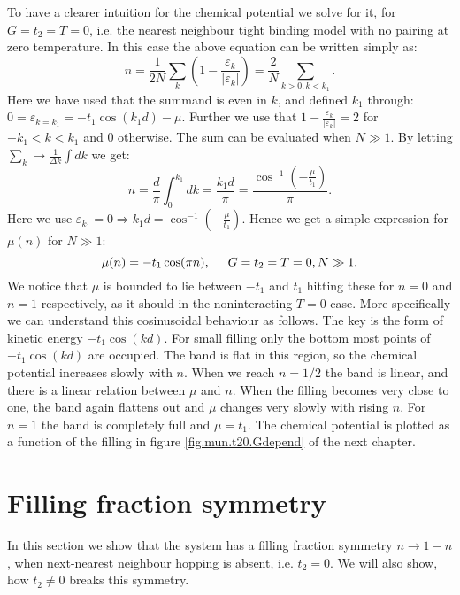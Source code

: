 To have a clearer intuition for the chemical potential we solve for it, for $G = t_2 = T = 0$, i.e. the nearest neighbour tight binding model with no pairing at zero temperature. In this case the above equation can be written simply as:
\begin{equation}
n = \frac{1}{2N}\sum_k \left( 1 - \frac{\varepsilon_k}{|\varepsilon_k|}\right) = \frac{2}{N}\sum_{k > 0, k < k_1}. \nonumber
\end{equation}
Here we have used that the summand is even in $k$, and defined $k_1$ through: $0 = \varepsilon_{k = k_1} = -t_1\cos(k_1d) - \mu$. Further we use that $1 - \frac{\varepsilon_k}{|\varepsilon_k|} = 2$ for $-k_1 < k < k_1$ and $0$ otherwise. The sum can be evaluated when $N \gg 1$. By letting $\sum_k \to \frac{1}{\Delta k}\int dk$ we get:
\begin{equation}
n = \frac{d}{\pi}\int_0^{k_1} dk =  \frac{k_1d}{\pi} = \frac{\cos^{-1}\left(-\frac{\mu}{t_1}\right)}{\pi}. \nonumber
\end{equation}
Here we use $\varepsilon_{k_1} = 0 \Rightarrow k_1d = \cos^{-1}\left(-\frac{\mu}{t_1}\right)$. Hence we get a simple expression for $\mu(n)$ for $N\gg 1$:
\begin{equation}
\mu(n) = -t_1\cos(\pi n), \hspace{0.5cm} G = t_2 = T = 0, N\gg 1. 
\label{eq.mun.T0.G0.t20.lattice}
\end{equation}
We notice that $\mu$ is bounded to lie between $-t_1$ and $t_1$ hitting these for $n = 0$ and $n = 1$ respectively, as it should in the noninteracting $T = 0$ case. More specifically we can understand this cosinusoidal behaviour as follows. The key is the form of kinetic energy $-t_1\cos(kd)$. For small filling only the bottom most points of $-t_1\cos(kd)$ are occupied. The band is flat in this region, so the chemical potential increases slowly with $n$. When we reach $n = 1/2$ the band is linear, and there is a linear relation between $\mu$ and $n$. When the filling becomes very close to one, the band again flattens out and $\mu$ changes very slowly with rising $n$. For $n = 1$ the band is completely full and $\mu = t_1$. The chemical potential is plotted as a function of the filling in figure \ref{fig.mun.t20.Gdepend} of the next chapter. 

\section{Filling fraction symmetry}
\label{sec.fillingfractionsymmetry.breakdown}
In this section we show that the system has a filling fraction symmetry $n \to 1 - n$, when next-nearest neighbour hopping is absent, i.e. $t_2 = 0$. We will also show, how $t_2 \neq 0$ breaks this symmetry. 

